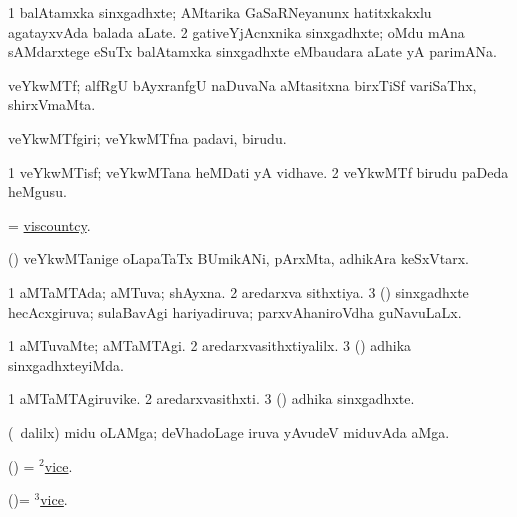 \noindent 
\gl{\pagu}
\expl{}
\bmng
\bnum
\num{1}  balAtamxka sinxgadhxte; AMtarika GaSaRNeyanunx hatitxkakxlu agatayxvAda balada aLate. 
\num{2} gativeYjAcnxnika sinxgadhxte; oMdu mAna sAMdarxtege eSuTx balAtamxka sinxgadhxte eMbaudara aLate yA parimANa. 
\enum
\emng
\eentry

\bentry 
{} 
\gl{\nA}
\expl{}
\bmng
 veYkwMTf; alfRgU bAyxranfgU naDuvaNa aMtasitxna birxTiSf variSaThx, shirxVmaMta. 
\emng
\eentry

\bentry 
{} 
\gl{\nA}
\bmng
 veYkwMTfgiri; veYkwMTfna padavi, birudu. 
\emng
\eentry

\bentry
{} 
\gl{\nA}
\expl{}
\bmng
\bnum
\num{1} veYkwMTisf; veYkwMTana heMDati yA vidhave. 
\num{2} veYkwMTf birudu paDeda heMgusu. 
\enum
\emng
\eentry

\bentry 
{} 
\gl{\nA}
\expl{}
\bmng
 = \hyperlink{viscountcy}{viscountcy}. 
\emng
\eentry

\bentry
{} 
\gl{\nA}
\bmng
 (\ca) veYkwMTanige oLapaTaTx BUmikANi, pArxMta, adhikAra keSxVtarx. 
\emng
\eentry

\bentry
{} 
\gl{\gu}
\expl{}
\bmng
\bnum
\num{1} aMTaMTAda; aMTuva; shAyxna. 
\num{2} aredarxva sithxtiya. 
\num{3} (\Bwvi) sinxgadhxte hecAcxgiruva; sulaBavAgi hariyadiruva; parxvAhaniroVdha guNavuLaLx. 
\enum
\emng
\eentry

\bentry
{} 
\gl{\kirxvi}
\expl{}
\bmng
\bnum
\num{1} aMTuvaMte; aMTaMTAgi. 
\num{2} aredarxvasithxtiyalilx. 
\num{3} (\Bwvi) adhika sinxgadhxteyiMda. 
\enum
\emng
\eentry

\bentry
{} 
\gl{\nA}
\expl{}
\bmng
\bnum
\num{1} aMTaMTAgiruvike. 
\num{2} aredarxvasithxti. 
\num{3} (\Bwvi) adhika sinxgadhxte. 
\enum
\emng
\eentry

\bentry
{} 
\gl{\nA}
\bmng
 (\sA\ \bava dalilx) midu oLAMga; deVhadoLage iruva yAvudeV miduvAda aMga. 
\emng
\eentry

\bentry 
{} 
\gl{\nA}
\expl{}
\bmng
 (\ame) = \hyperlink{vice(2)}{$^2$vice}. 
\emng
\eentry

\bentry
{} 
\gl{\sakirx}
\expl{}
\bmng
 (\ame)= \hyperlink{vice(3)}{$^3$vice}. 
\emng
\eentry


